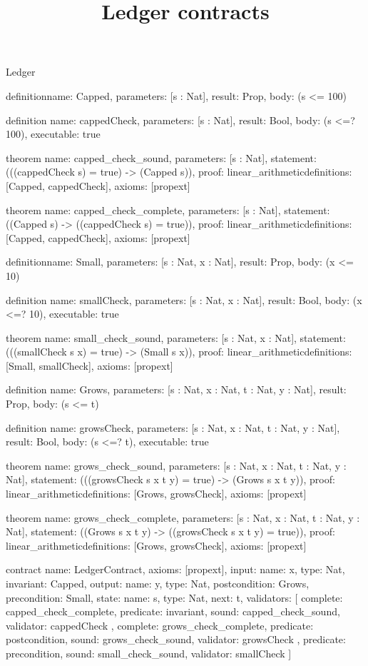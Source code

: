 \begin{lexlean}{Ledger}
\title{Ledger contracts}
\begin{semanticmodule}
definition{name: Capped, parameters: [s : Nat], result: Prop, body: (s <= 100)}

definition{
  name: cappedCheck,
  parameters: [s : Nat],
  result: Bool,
  body: (s <=? 100),
  executable: true
}

theorem{
  name: capped_check_sound,
  parameters: [s : Nat],
  statement: (((cappedCheck s) = true) -> (Capped s)),
  proof: linear_arithmetic{definitions: [Capped, cappedCheck]},
  axioms: [propext]
}

theorem{
  name: capped_check_complete,
  parameters: [s : Nat],
  statement: ((Capped s) -> ((cappedCheck s) = true)),
  proof: linear_arithmetic{definitions: [Capped, cappedCheck]},
  axioms: [propext]
}

definition{name: Small, parameters: [s : Nat, x : Nat], result: Prop, body: (x <= 10)}

definition{
  name: smallCheck,
  parameters: [s : Nat, x : Nat],
  result: Bool,
  body: (x <=? 10),
  executable: true
}

theorem{
  name: small_check_sound,
  parameters: [s : Nat, x : Nat],
  statement: (((smallCheck s x) = true) -> (Small s x)),
  proof: linear_arithmetic{definitions: [Small, smallCheck]},
  axioms: [propext]
}

definition{
  name: Grows,
  parameters: [s : Nat, x : Nat, t : Nat, y : Nat],
  result: Prop,
  body: (s <= t)
}

definition{
  name: growsCheck,
  parameters: [s : Nat, x : Nat, t : Nat, y : Nat],
  result: Bool,
  body: (s <=? t),
  executable: true
}

theorem{
  name: grows_check_sound,
  parameters: [s : Nat, x : Nat, t : Nat, y : Nat],
  statement: (((growsCheck s x t y) = true) -> (Grows s x t y)),
  proof: linear_arithmetic{definitions: [Grows, growsCheck]},
  axioms: [propext]
}

theorem{
  name: grows_check_complete,
  parameters: [s : Nat, x : Nat, t : Nat, y : Nat],
  statement: ((Grows s x t y) -> ((growsCheck s x t y) = true)),
  proof: linear_arithmetic{definitions: [Grows, growsCheck]},
  axioms: [propext]
}

contract{
  name: LedgerContract,
  axioms: [propext],
  input: {name: x, type: Nat},
  invariant: Capped,
  output: {name: y, type: Nat},
  postcondition: Grows,
  precondition: Small,
  state: {name: s, type: Nat, next: t},
  validators: [
    {
      complete: capped_check_complete,
      predicate: invariant,
      sound: capped_check_sound,
      validator: cappedCheck
    },
    {
      complete: grows_check_complete,
      predicate: postcondition,
      sound: grows_check_sound,
      validator: growsCheck
    },
    {predicate: precondition, sound: small_check_sound, validator: smallCheck}
  ]
}


\end{semanticmodule}
\end{lexlean}
